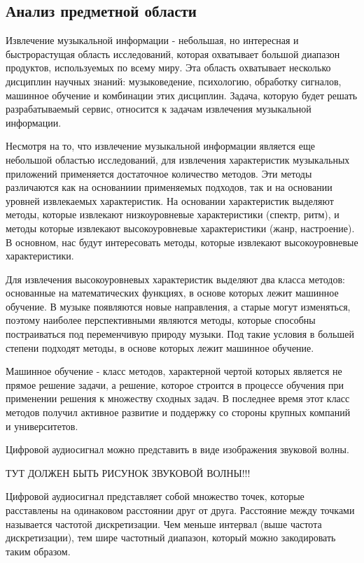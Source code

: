 \subsection{Анализ предметной области}
\label{sec:analysis:literature}

Извлечение музыкальной информации - небольшая, но интересная и быстрорастущая область исследований, которая охватывает большой диапазон продуктов, используемых по всему миру. Эта область охватывает несколько дисциплин научных знаний: музыковедение, психологию, обработку сигналов, машинное обучение и комбинации этих дисциплин. Задача, которую будет решать разрабатываемый сервис, относится к задачам извлечения музыкальной информации.

Несмотря на то, что извлечение музыкальной информации является еще небольшой областью исследований, для извлечения характеристик музыкальных приложений применяется достаточное количество методов. Эти методы различаются как на основаниии применяемых подходов, так и на основании уровней извлекаемых характеристик. На основании характеристик выделяют методы, которые извлекают низкоуровневые характеристики (спектр, ритм), и методы которые извлекают высокоуровневые характеристики (жанр, настроение). В основном, нас будут интересовать методы, которые извлекают высокоуровневые характеристики.

Для извлечения высокоуровневых характеристик выделяют два класса методов: основанные на математических функциях, в основе которых лежит машинное обучение. В музыке появляются новые направления, а старые могут изменяться, поэтому наиболее перспективными являются методы, которые способны постраиваться под переменчивую природу музыки. Под такие условия в большей степени подходят методы, в основе которых лежит машинное обучение.

Машинное обучение - класс методов, характерной чертой которых является не прямое решение задачи, а решение, которое строится в процессе обучения при применении решения к множеству сходных задач. В последнее время этот класс методов получил активное развитие и поддержку со стороны крупных компаний и университетов.

Цифровой аудиосигнал можно представить в виде изображения звуковой волны.

ТУТ ДОЛЖЕН БЫТЬ РИСУНОК ЗВУКОВОЙ ВОЛНЫ!!!

Цифровой аудиосигнал представляет собой множество точек, которые расставлены на одинаковом расстоянии друг от друга. Расстояние между точками называется частотой дискретизации. Чем меньше интервал (выше частота дискретизации), тем шире частотный диапазон, который можно закодировать таким образом.

